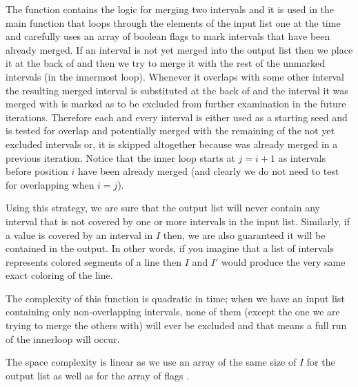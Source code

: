 The function  contains the logic for merging two intervals and it is used in the main function  that loops through the elements of the input list one at the time and carefully uses an array of boolean flags  to mark intervals that have been already merged.
If an interval is not yet merged into the output list  then we place it at the back of  and then we try to merge it with the rest of the unmarked intervals (in the innermost loop).
Whenever it overlaps with some other interval the resulting merged interval is substituted at the back of  and the interval it was merged with is marked as to be excluded from further examination in the future iterations.
Therefore each and every interval is either used as a starting seed and is tested for overlap and potentially merged with the remaining of the not yet excluded intervals or, it is skipped altogether because was already merged in a previous iteration.
Notice that the inner loop starts at $j=i+1$ as intervals before position $i$ have been already merged (and clearly we do not need to test for overlapping when $i=j$).

Using this strategy, we are sure that the output list will never contain any interval that is not covered by one or more intervals in the input list. 
Similarly, if a value is covered by an interval in $I$ then, we are also guaranteed it will be contained in the output.
In other words, if you imagine that a list of intervals represents colored segments of a line then $I$ and $I'$ would produce the very same exact coloring of the line.

The complexity of this function is quadratic in time; when we have an input list containing only non-overlapping intervals, none of them (except the one we are trying to merge the others with) will ever be excluded and that means a full run of the innerloop will occur.

The space complexity is linear as we use an array of the same size of $I$ for the output list as well as for the array of flags . 

